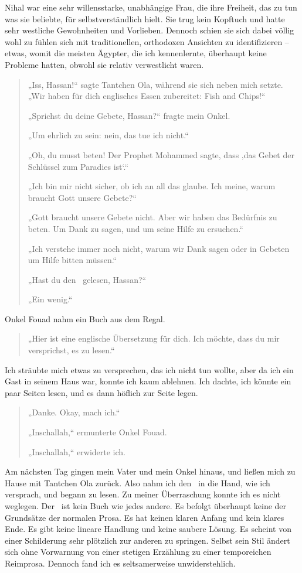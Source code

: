\documentclass[12pt]{memoir}
\begin{document}
Nihal war eine sehr willensstarke, unabhängige Frau, die ihre Freiheit,
das zu tun was sie beliebte, für selbstverständlich hielt.
Sie trug kein Kopftuch und hatte sehr westliche Gewohnheiten und Vorlieben.
Dennoch schien sie sich dabei völlig wohl zu fühlen sich mit traditionellen,
orthodoxen Ansichten zu identifizieren – etwas, womit die meisten Ägypter,
die ich kennenlernte, überhaupt keine Probleme hatten,
obwohl sie relativ verwestlicht waren.

\begin{quote}
„Iss, Hassan!“ sagte Tantchen Ola, während sie sich neben mich setzte.
„Wir haben für dich englisches Essen zubereitet: Fish and Chips!“

„Sprichst du deine Gebete, Hassan?“ fragte mein Onkel.

„Um ehrlich zu sein: nein, das tue ich nicht.“

„Oh, du musst beten! Der Prophet Mohammed sagte,
dass ‚das Gebet der Schlüssel zum Paradies ist‘.“

„Ich bin mir nicht sicher, ob ich an all das glaube.
Ich meine, warum braucht Gott unsere Gebete?“

„Gott braucht unsere Gebete nicht. Aber wir haben das Bedürfnis zu beten.
Um Dank zu sagen, und um seine Hilfe zu ersuchen.“

„Ich verstehe immer noch nicht,
warum wir Dank sagen oder in Gebeten um Hilfe bitten müssen.“

„Hast du den \Quran\ gelesen, Hassan?“

„Ein wenig.“
\end{quote}

Onkel Fouad nahm ein Buch aus dem Regal.

\begin{quote}
„Hier ist eine englische Übersetzung für dich.
Ich möchte, dass du mir versprichst, es zu lesen.“
\end{quote}

Ich sträubte mich etwas zu versprechen, das ich nicht tun wollte,
aber da ich ein Gast in seinem Haus war, konnte ich kaum ablehnen.
Ich dachte, ich könnte ein paar Seiten lesen,
und es dann höflich zur Seite legen.

\begin{quote}
„Danke. Okay, mach ich.“

„Inschallah,“ ermunterte Onkel Fouad.

„Inschallah,“ erwiderte ich.
\end{quote}

Am nächsten Tag gingen mein Vater und mein Onkel hinaus,
und ließen mich zu Hause mit Tantchen Ola zurück.
Also nahm ich den \Quran\ in die Hand, wie ich versprach, und begann zu lesen.
Zu meiner Überraschung konnte ich es nicht weglegen.
Der \Quran\ ist kein Buch wie jedes andere.
Es befolgt überhaupt keine der Grundsätze der normalen Prosa.
Es hat keinen klaren Anfang und kein klares Ende.
Es gibt keine lineare Handlung und keine saubere Lösung.
Es scheint von einer Schilderung sehr plötzlich zur anderen zu springen.
Selbst sein Stil ändert sich ohne Vorwarnung von einer stetigen Erzählung
zu einer temporeichen Reimprosa.
Dennoch fand ich es seltsamerweise unwiderstehlich.
\end{document}
